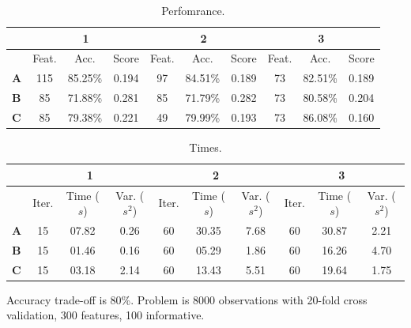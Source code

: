\begin{table}[h]
    \centering
    \begin{tabular}{l | c c c|c c c|c c c}
        \toprule
        \multicolumn{1}{c}{} & \multicolumn{3}{c}{\textbf{1}} & \multicolumn{3}{c}{\textbf{2}} & \multicolumn{3}{c}{\textbf{3}}\\
        \midrule
        &Feat.&Acc.&Score&Feat.&Acc.&Score&Feat.&Acc.&Score \\
        \midrule
        \textbf{A}&      115 & 85.25\% & 0.194 &      97 & 84.51\% & 0.189 &     73 & 82.51\% & 0.189\\
        \textbf{B}&      85 & 71.88\% & 0.281 &       85 & 71.79\% & 0.282 &     73 & 80.58\% & 0.204\\
        \textbf{C}&      85 & 79.38\% & 0.221 &       49 & 79.99\% & 0.193 &     73 & 86.08\% & 0.160\\
        \bottomrule
        \end{tabular}
    \caption{Perfomrance.}
\end{table}

\begin{table}[h]
    \centering
    \begin{tabular}{l | c c c | c c c | c c c }
        \toprule
        \multicolumn{1}{c}{} &\multicolumn{3}{c}{\textbf{1}} & \multicolumn{3}{c}{\textbf{2}} & \multicolumn{3}{c}{\textbf{3}}\\
        \midrule
        &Iter.&Time ($s$) &Var. ($s^2$)&Iter.&Time ($s$) &Var. ($s^2$)&Iter.&Time ($s$) &Var. ($s^2$) \\
        \midrule
        \textbf{A}&      15 & 07.82 & 0.26 &      60 & 30.35 & 7.68 &     60 & 30.87 & 2.21\\
        \textbf{B}&      15 & 01.46 & 0.16 &      60 & 05.29 & 1.86 &     60 & 16.26 & 4.70\\
        \textbf{C}&      15 & 03.18 & 2.14 &      60 & 13.43 & 5.51 &     60 & 19.64 & 1.75\\
        \bottomrule
        \end{tabular}
    \caption{Times.}
\end{table}

Accuracy trade-off is 80\%. Problem is 8000 observations with 20-fold cross validation, 300 features, 100 informative.